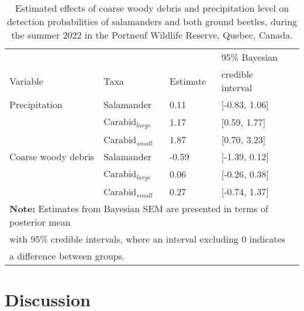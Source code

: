 \begin{table}[ht]
  \centering
  \caption[Estimated effects of coarse woody debris and precipitation level on detection probabilities of salamanders and both ground beetles.]
  {Estimated effects of coarse woody debris and precipitation level on detection probabilities of salamanders and both ground beetles, during the summer 2022 in the Portneuf Wildlife Reserve,  Quebec, Canada.}
  \label{tab:detection}
  \begin{tabular}{lllll} 
      \hline
      &&&95\% Bayesian \\
      Variable & Taxa & Estimate &  credible interval \\ [0.5ex] 
      \hline      
      Precipitation       & Salamander              & \hspace{1mm}0.11 & [-0.83, 1.06] \\ 
                          & Carabid$_{large}$  & \hspace{1mm}1.17 & [0.59, 1.77] \\ 
                          & Carabid$_{small}$        & \hspace{1mm}1.87 & [0.70, 3.23] \\  
      \hline      
      Coarse woody debris & Salamander              & -0.59 & [-1.39, 0.12] \\ 
                          & Carabid$_{large}$  & \hspace{1mm}0.06 & [-0.26, 0.38] \\ 
                          & Carabid$_{small}$        & \hspace{1mm}0.27 & [-0.74, 1.37] \\   

      \hline
      \multicolumn{4}{l}{\textbf{Note:} Estimates from Bayesian SEM are presented in terms of posterior mean} \\
      \multicolumn{4}{l}{with 95\% credible intervals, where an interval excluding 0 indicates} \\
      \multicolumn{4}{l}{a difference between groups.} \\
  \end{tabular}
\end{table}

\clearpage

\section*{Discussion}
\label{sec:discu1}

